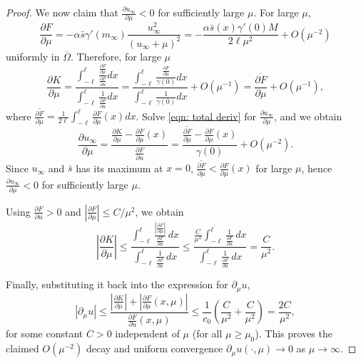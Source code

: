 \documentclass{article}
\begin{document}
\begin{proof}
We now claim that $\frac{\partial u_\infty}{\partial \mu}<0$ for sufficiently large $\mu$. For large $\mu$, 
\[\frac{\partial F}{\partial \mu}  = -\alpha\bar s\gamma'(m_\infty) \frac{u_\infty^2}{(u_\infty+\mu)^2}=-\frac{\alpha\bar s(x)\gamma'(0)M}{2\ell\mu^2}+O(\mu^{-2})\] uniformly in $\overline{\Omega}$. Therefore, for large $\mu$
\[\frac{\partial K}{\partial \mu}  = \frac{\displaystyle\int_{-\ell}^{\ell}\frac{\frac{\partial F}{\partial \mu} }{\frac{\partial F}{\partial u} }dx}{\displaystyle\int_{-\ell}^{\ell}\frac{1}{\frac{\partial F}{\partial u} }dx}=\frac{\displaystyle\int_{-\ell}^{\ell}\frac{\frac{\partial F}{\partial \mu} }{\gamma(0)}dx}{\displaystyle\int_{-\ell}^{\ell}\frac{1}{\gamma(0)}dx} +O(\mu^{-1})= \overline{\frac{\partial F}{\partial \mu} } + O(\mu^{-1}),\] where $\overline{\frac{\partial F}{\partial \mu} } = \frac{1}{2\ell}\int_{-\ell}^\ell \frac{\partial F}{\partial \mu} (x)dx$. Solve \eqref{eqn: total deriv} for $\frac{\partial u_\infty}{\partial \mu}$, and we obtain
\[\frac{\partial u_\infty}{\partial \mu} = \frac{\frac{\partial K}{\partial \mu}  - \frac{\partial F}{\partial \mu} (x)}{\frac{\partial F}{\partial u} } = \frac{\overline{\frac{\partial F}{\partial \mu} }-\frac{\partial F}{\partial \mu} (x)}{\gamma(0)}+O(\mu^{-2}).  \]
Since $u_\infty$ and $\bar s$ has its maximum at $x=0$, $\overline{\frac{\partial F}{\partial \mu} }<\frac{\partial F}{\partial \mu} (x)$ for large $\mu$, hence $\frac{\partial u_\infty}{\partial \mu}<0$ for sufficiently large $\mu$. 

Using $\frac{\partial F}{\partial u} >0$ and $|\frac{\partial F}{\partial \mu} |\le C/\mu^2$, we obtain
\[
|\frac{\partial K}{\partial \mu} |
\le
\frac{\displaystyle\int_{-\ell}^{\ell} \frac{|\frac{\partial F}{\partial \mu} |}{\frac{\partial F}{\partial u} }\,dx}
{\displaystyle\int_{-\ell}^{\ell} \frac{1}{\frac{\partial F}{\partial u} }\,dx}
\le
\frac{\displaystyle\frac{C}{\mu^2}\int_{-\ell}^{\ell} \frac{1}{\frac{\partial F}{\partial u} }\,dx}
{\displaystyle\int_{-\ell}^{\ell} \frac{1}{\frac{\partial F}{\partial u} }\,dx}
= \frac{C}{\mu^2}.
\]

Finally, substituting it back into the expression for $\partial_\mu u$,
\[
|\partial_\mu u|
\le
\frac{|\frac{\partial K}{\partial \mu} | + |\frac{\partial F}{\partial \mu} (x,\mu)|}{\frac{\partial F}{\partial u} (x,\mu)}
\le
\frac{1}{c_0}\left(\frac{C}{\mu^2} + \frac{C}{\mu^2}\right)
= \frac{2C}{\mu^2},
\]
for some constant $C>0$ independent of $\mu$ (for all $\mu\ge \mu_0$). This proves the claimed $O(\mu^{-2})$ decay and uniform convergence $\partial_\mu u(\cdot,\mu)\to 0$ as $\mu\to\infty$.


\end{proof}
\end{document}
